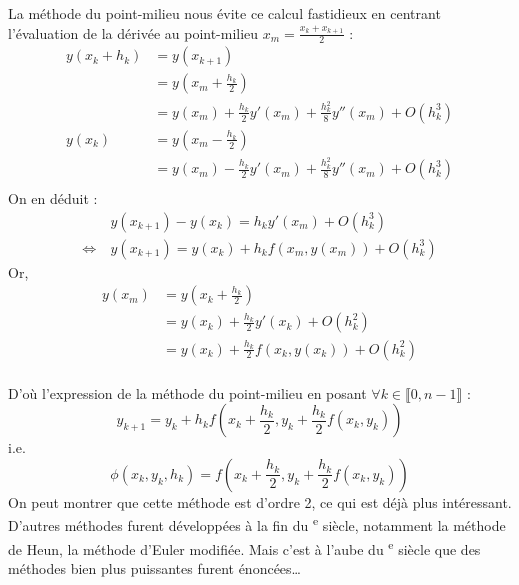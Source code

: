\documentclass[a4paper, titlepage]{livret} %
\def\siecle#1{\textsc{\romannumeral #1}\textsuperscript{e}} %
\begin{document}
				La méthode du point-milieu nous évite ce calcul fastidieux en centrant l'évaluation de la dérivée au point-milieu $x_{m} = \frac{x_{k} + x_{k+1}}{2}$ :
				\[
				\begin{aligned}
					y(x_{k} + h_{k}) & = y(x_{k+1}) \\
					 				 & = y(x_{m} + \frac{h_{k}}{2}) \\
					 				 & = y(x_{m}) + \frac{h_{k}}{2}y'(x_{m}) + \frac{h_{k}^{2}}{8}y''(x_{m}) + O(h_{k}^{3}) \\
				    y(x_{k}) & = y(x_{m} - \frac{h_{k}}{2}) \\
				    		 & = y(x_{m}) - \frac{h_{k}}{2}y'(x_{m}) + \frac{h_{k}^{2}}{8}y''(x_{m}) + O(h_{k}^{3}) \\ 
				\end{aligned}
				\]
				On en déduit :
				\[
				\begin{aligned}
					& y(x_{k+1}) - y(x_{k}) = h_{k}y'(x_{m}) + O(h_{k}^{3}) \\
					\Leftrightarrow \ & y(x_{k+1}) = y(x_{k}) + h_{k}f(x_{m}, y(x_{m})) + O(h_{k}^{3})
				\end{aligned}
				\]
				Or,
				\[
				\begin{aligned}
				    y(x_{m}) & = y(x_{k} + \frac{h_{k}}{2}) \\
				    		 & = y(x_{k}) + \frac{h_{k}}{2}y'(x_{k}) + O(h_{k}^{2}) \\ 
				    		 & = y(x_{k}) + \frac{h_{k}}{2}f(x_{k}, y(x_{k})) + O(h_{k}^{2}) \\ 
				\end{aligned}
				\]

				D'où l'expression de la méthode du point-milieu en posant $\forall k \in \llbracket 0, n-1 \rrbracket$ :
				\[
					y_{k+1} = y_{k} + h_{k}f\left(x_{k} + \frac{h_{k}}{2}, y_{k} + \frac{h_{k}}{2}f(x_{k}, y_{k})\right) 
				\]
				i.e.
				\[
					\phi(x_{k}, y_{k}, h_{k}) = f\left(x_{k} + \frac{h_{k}}{2}, y_{k} + \frac{h_{k}}{2}f(x_{k}, y_{k})\right)
				\]
				On peut montrer que cette méthode est d'ordre 2, ce qui est déjà plus intéressant.
				D'autres méthodes furent développées à la fin du \siecle{19} siècle, notamment la méthode de Heun, la méthode d'Euler modifiée.
				Mais c'est à l'aube du \siecle{20} siècle que des méthodes bien plus puissantes furent énoncées…
\end{document}
